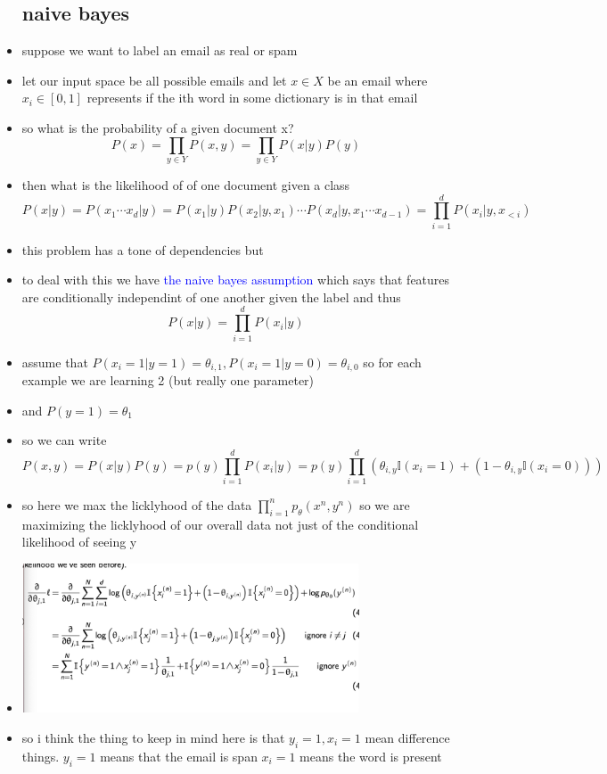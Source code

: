 \documentclass{article}
\begin{document}
\begin{itemize}
\subsection*{naive bayes}
\item suppose we want to label an email as real or spam 
\item let our input space be all possible emails and let $x\in X$ be an email where $x_i\in [0,1]$ represents if the ith word in some dictionary is in that email 
\item so what is the probability of a given document x? $$P(x)=\prod_{y\in Y}P(x,y)=\prod_{y\in Y}P(x|y)P(y)$$
\item then what is the likelihood of of one document given a class $$P(x|y)=P(x_1\cdots x_d|y)=P(x_1|y)P(x_2|y,x_1)\cdots P(x_d|y, x_1 \cdots x_{d-1})=\prod_{i=1}^{d}P(x_i|y,x_{<i})$$
\item this problem has a tone of dependencies but 
\item to deal with this we have \textcolor{blue}{the naive bayes assumption} which says that features are conditionally independint of one another given the label and thus $$P(x|y)=\prod_{i=1}^{d}P(x_i|y)$$
\item assume  that  $P(x_i=1|y=1)=\theta_{i,1}, P(x_i=1|y=0)=\theta_{i,0}$ so for each example we are learning 2 (but really one parameter)
\item and $P(y=1)=\theta_{1}$
\item so we can write $$P(x,y)=P(x|y)P(y)=p(y)\prod_{i=1}^{d}P(x_i|y)=p(y)\prod_{i=1}^{d}(\theta_{i,y}\mathbb{I}(x_i=1)+(1-\theta_{i,y}\mathbb{I}(x_i=0)))$$
\item so here we max the licklyhood of the data $\prod_{i=1}^{n}p_{\theta}(x^{n}, y^{n})$ so we are maximizing the licklyhood of our overall data not just of the conditional likelihood of seeing y
\item  \includegraphics*[width=10cm]{images/Screenshot 2023-05-13 at 9.57.35 PM.png}
\item so i think the thing to keep in mind here is that $y_{i}=1, x_{i}=1$ mean difference things. $y_i=1$ means that the email is span $x_{i}=1$ means the word is present

\end{itemize}
\end{document}
